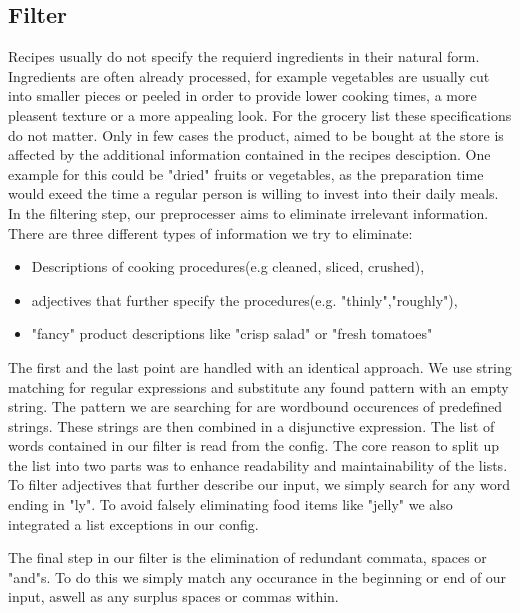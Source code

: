\subsection{Filter}\label{sub:filter}
Recipes usually do not specify the requierd ingredients in their natural form. Ingredients are often already processed, for example vegetables are usually cut into smaller pieces or peeled in order to provide lower cooking times, a more pleasent texture or a more appealing look. For the grocery list these specifications do not matter. Only in few cases the product, aimed to be bought at the store is affected by the additional information contained in the recipes desciption. One example for this could be "dried" fruits or vegetables, as the preparation time would exeed the time a regular person is willing to invest into their daily meals.\\
In the filtering step, our preprocesser aims to eliminate irrelevant information. 
There are three different types of information we try to eliminate: 
\begin{itemize}
	\item Descriptions of cooking procedures(e.g cleaned, sliced, crushed),
	\item adjectives that further specify the procedures(e.g. "thinly","roughly"),
	\item "fancy" product descriptions like "crisp salad" or "fresh tomatoes"	
\end{itemize}
The first and the last point are handled with an identical approach. We use string matching for regular expressions and substitute any found pattern with an empty string. The pattern we are searching for are wordbound occurences of predefined strings. These strings are then combined in a disjunctive expression.
The list of words contained in our filter is read from the config.
The core reason to split up the list into two parts was to enhance readability and maintainability of the lists.\\
To filter adjectives that further describe our input, we simply search for any word ending in "ly". To avoid falsely eliminating food items like "jelly" we also integrated a list exceptions in our config.

The final step in our filter is the elimination of redundant commata, spaces or "and"s. To do this we simply match any occurance in the beginning or end of our input, aswell as any surplus spaces or commas within.

